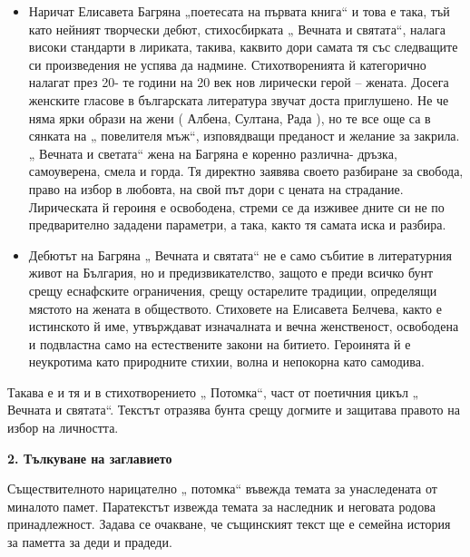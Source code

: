 \documentclass[12pt,a4paper]{article}
\begin{document}
\begin{itemize}[leftmargin=*]
\vspace{-0.2cm}
\item Наричат Елисавета Багряна „поетесата на първата книга“ и това е така, тъй като нейният творчески
дебют, стихосбирката „ Вечната и святата“, налага високи стандарти в лириката, такива, каквито
дори самата тя със следващите си произведения не успява да надмине. Стихотворенията й
категорично налагат през 20- те години на 20 век нов лирически герой – жената. Досега женските
гласове в българската литература звучат доста приглушено. Не че няма ярки образи на жени (
Албена, Султана, Рада ), но те все още са в сянката на „ повелителя мъж“, изповядващи преданост и
желание за закрила. „ Вечната и светата“ жена на Багряна е коренно различна- дръзка, самоуверена,
смела и горда. Тя директно заявява своето разбиране за свобода, право на избор в любовта, на свой
път дори с цената на страдание. Лирическата й героиня е освободена, стреми се да изживее дните
си не по предварително зададени параметри, а така, както тя самата иска и разбира.
\end{itemize}

\begin{itemize}[leftmargin=*]
\vspace{-0.75cm}
\item Дебютът на Багряна „ Вечната и святата“ не е само събитие в литературния живот на България, но и
предизвикателство, защото е преди всичко бунт срещу еснафските ограничения, срещу остарелите
традиции, определящи мястото на жената в обществото. Стиховете на Елисавета Белчева, както е
истинското й име, утвърждават изначалната и вечна женственост, освободена и подвластна само на
естествените закони на битието. Героинята й е неукротима като природните стихии, волна и
непокорна като самодива.
\end{itemize}

\vspace{0.1cm}
 
\indent Такава е и тя и в стихотворението „ Потомка“, част от поетичния цикъл „ Вечната и святата“.
Текстът отразява бунта срещу догмите и защитава правото на избор на личността.

\vspace{0.1cm}
\textbf{2. Тълкуване на заглавието}
\vspace{0.1cm}
 
\indent Съществителното нарицателно „ потомка“ въвежда темата за унаследената от миналото памет.
Паратекстът извежда темата за наследник и неговата родова принадлежност. Задава се очакване,
че същинският текст ще е семейна история за паметта за деди и прадеди.
\end{document}
